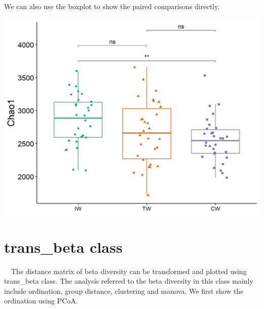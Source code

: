 \documentclass[
]{book}
\newenvironment{Shaded}{\begin{snugshade}}{\end{snugshade}}
\newcommand{\AttributeTok}[1]{\textcolor[rgb]{0.77,0.63,0.00}{#1}}
\newcommand{\CommentTok}[1]{\textcolor[rgb]{0.56,0.35,0.01}{\textit{#1}}}
\newcommand{\ConstantTok}[1]{\textcolor[rgb]{0.00,0.00,0.00}{#1}}
\newcommand{\FunctionTok}[1]{\textcolor[rgb]{0.00,0.00,0.00}{#1}}
\newcommand{\NormalTok}[1]{#1}
\newcommand{\OtherTok}[1]{\textcolor[rgb]{0.56,0.35,0.01}{#1}}
\newcommand{\SpecialCharTok}[1]{\textcolor[rgb]{0.00,0.00,0.00}{#1}}
\newcommand{\StringTok}[1]{\textcolor[rgb]{0.31,0.60,0.02}{#1}}
\begin{document}
We can also use the boxplot to show the paired comparisons directly.

\begin{Shaded}
\end{Shaded}

\begin{center}\includegraphics[width=600px]{Images/plot_alpha} \end{center}

\hypertarget{trans_beta-class}{%
\section{trans\_beta class}\label{trans_beta-class}}

　The distance matrix of beta diversity can be transformed and plotted using trans\_beta class.
The analysis referred to the beta diversity in this class mainly include ordination, group distance, clustering and manova.
We first show the ordination using PCoA.

\begin{Shaded}
\end{Shaded}
\end{document}
